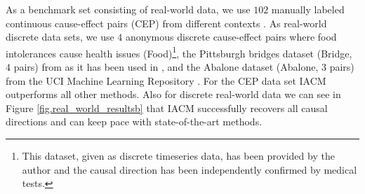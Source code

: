 \documentclass[letterpaper]{article}
\begin{document}
As a benchmark set consisting of real-world data, we use $102$ manually labeled continuous cause-effect pairs (CEP) from different contexts \cite{MPJZS16, DG19}. As real-world discrete data sets, we use $4$ anonymous discrete cause-effect pairs where food intolerances cause health issues (Food)\footnote{This dataset, given as discrete timeseries data, has been provided by the author and the causal direction has been independently confirmed by medical tests.}, the Pittsburgh bridges dataset (Bridge, $4$ pairs) from \cite{DG19} as it has been used in \cite{CQZZH18}, and the Abalone dataset (Abalone, $3$ pairs) from the UCI Machine Learning Repository \cite{DG19}. For the CEP data set IACM outperforms all other methods. Also for discrete real-world data we can see in Figure \ref{fig.real_world_resultsb} that IACM successfully recovers all causal directions and can keep pace with state-of-the-art methods.
\end{document}
